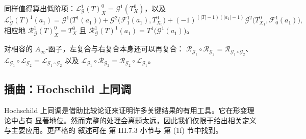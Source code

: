 
同样值得算出低阶项：$\mathcal L^1_{\mathcal G}(T)^0_X=\mathcal G^1(T^0_X)$，以及
\[
  \mathcal L^1_{\mathcal G}(T)^1(a_1)=\mathcal G^1\bigl(T^1(a_1)\bigr)
  +\mathcal G^2\bigl(\mathcal F_1^1(a_1),T^0_{X_0}\bigr)
  +(-1)^{(|T|-1)(|a_1|-1)}\mathcal G^2\bigl(T^0_{X_1},\mathcal F_0^1(a_1)\bigr),
\]
相应地 $\mathcal R^1_{\mathcal G}(T)^0_X=T^0_X$ 且
$\mathcal R^1_{\mathcal G}(T)^1(a_1)=T^1\bigl(\mathcal G^1(a_1)\bigr)$。

对相容的 $A_\infty$-函子，左复合与右复合本身还可以再复合：
$\mathcal R_{\mathcal G_1}\circ\mathcal R_{\mathcal G_2}=
\mathcal R_{\mathcal G_1\circ\mathcal G_2}$、
$\mathcal L_{\mathcal G_1}\circ\mathcal L_{\mathcal G_2}=
\mathcal L_{\mathcal G_1\circ\mathcal G_2}$ 以及
$\mathcal L_{\mathcal G_1}\circ\mathcal R_{\mathcal G_2}=
\mathcal R_{\mathcal G_2}\circ\mathcal L_{\mathcal G_1}$。

\subsection{插曲：Hochschild 上同调}\label{sec:2.4}

Hochschild 上同调是借助比较论证来证明许多关键结果的有用工具。它在形变理论中占有
显著地位。然而完整的处理会离题太远，因此我们仅限于给出相关定义与主要应用。更严格的
叙述可在 \cite{GM03} 第 III.7.3 小节与 \cite{Sei08} 第 (1f) 节中找到。

